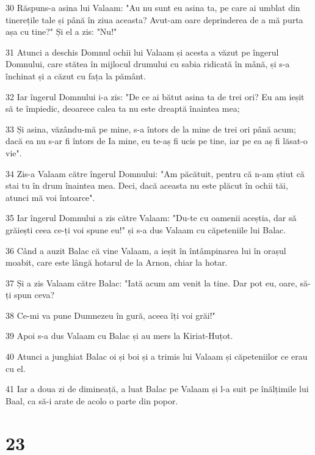 \par 30 Răspuns-a asina lui Valaam: "Au nu sunt eu asina ta, pe care ai umblat din tinerețile tale și până în ziua aceasta? Avut-am oare deprinderea de a mă purta așa cu tine?" Și el a zis: "Nu!"
\par 31 Atunci a deschis Domnul ochii lui Valaam și acesta a văzut pe îngerul Domnului, care stătea în mijlocul drumului cu sabia ridicată în mână, și s-a închinat și a căzut cu fața la pământ.
\par 32 Iar îngerul Domnului i-a zis: "De ce ai bătut asina ta de trei ori? Eu am ieșit să te împiedic, deoarece calea ta nu este dreaptă înaintea mea;
\par 33 Și asina, văzându-mă pe mine, s-a întors de la mine de trei ori până acum; dacă ea nu s-ar fi întors de Ia mine, eu te-aș fi ucis pe tine, iar pe ea aș fi lăsat-o vie".
\par 34 Zis-a Valaam către îngerul Domnului: "Am păcătuit, pentru că n-am știut că stai tu în drum înaintea mea. Deci, dacă aceasta nu este plăcut în ochii tăi, atunci mă voi întoarce".
\par 35 Iar îngerul Domnului a zis către Valaam: "Du-te cu oamenii aceștia, dar să grăiești ceea ce-ți voi spune eu!" și s-a dus Valaam cu căpeteniile lui Balac.
\par 36 Când a auzit Balac că vine Valaam, a ieșit în întâmpinarea lui în orașul moabit, care este lângă hotarul de la Arnon, chiar la hotar.
\par 37 Și a zis Valaam către Balac: "Iată acum am venit la tine. Dar pot eu, oare, să-ți spun ceva?
\par 38 Ce-mi va pune Dumnezeu în gură, aceea îți voi grăi!"
\par 39 Apoi s-a dus Valaam cu Balac și au mers la Kiriat-Huțot.
\par 40 Atunci a junghiat Balac oi și boi și a trimis lui Valaam și căpeteniilor ce erau cu el.
\par 41 Iar a doua zi de dimineață, a luat Balac pe Valaam și l-a suit pe înălțimile lui Baal, ca să-i arate de acolo o parte din popor.

\chapter{23}

